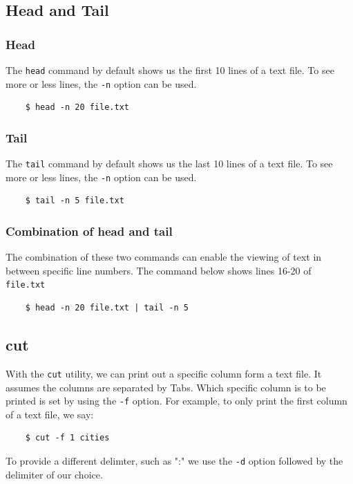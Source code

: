 \documentclass{report}
\begin{document}
	\subsection{Head and Tail}
	\subsubsection{Head}
	The \verb|head| command by default shows us the first 10 lines of a text file. To see more or less lines, the \verb|-n| option can be used.
	
	\begin{verbatim}
	$ head -n 20 file.txt
	\end{verbatim}
	
	\subsubsection{Tail}
	The \verb|tail| command by default shows us the last 10 lines of a text file. To see more or less lines, the \verb|-n| option can be used.
	
	\begin{verbatim}
	$ tail -n 5 file.txt
	\end{verbatim}
	
	\subsubsection{Combination of head and tail}
	The combination of these two commands can enable the viewing of text in between specific line numbers. The command below shows lines 16-20 of \texttt{file.txt}
	
	\begin{verbatim}
	$ head -n 20 file.txt | tail -n 5
	\end{verbatim}
	
	\subsection{cut}
	With the \verb|cut| utility, we can print out a specific column form a text file. It assumes the columns are separated by Tabs. Which specific column is to be printed is set by using the \verb|-f| option. For example, to only print the first column of a text file, we say:
	
	\begin{verbatim}
	$ cut -f 1 cities
	\end{verbatim}
	
	\noindent
	To provide a different delimter, such as ":" we use the \verb|-d| option followed by the delimiter of our choice. 
	
\end{document}
